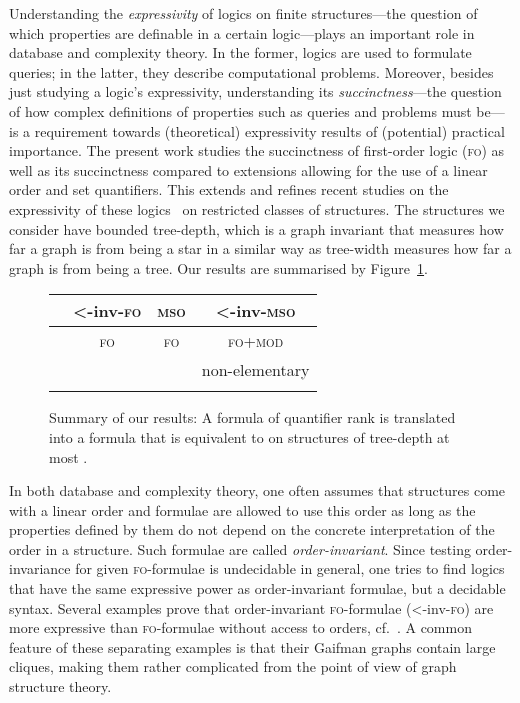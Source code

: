 \documentclass[11pt]{article}
\newcommand{\logic}[1]{\textsc{#1}}
\newcommand{\FO}{\logic{fo}}
\newcommand{\FOmod}{\logic{fo+mod}}
\newcommand{\MSO}{\logic{mso}}
\newcommand{\ordinv}[1]{\textnormal{{\small \textless}-inv-}#1}
\newcommand{\oiFO}{\ordinv{\FO{}}}
\newcommand{\oiMSO}{\ordinv{\MSO{}}}
\begin{document}
Understanding the \emph{expressivity} of logics on finite structures---the
question of which properties are definable in a certain logic---plays an
important role in database and complexity theory. In the former, logics are used
to formulate queries; in the latter, they describe computational
problems. Moreover, besides just studying a logic's expressivity, understanding
its \emph{succinctness}---the question of how complex definitions of properties
such as queries and problems must be---is a requirement towards (theoretical)
expressivity results of (potential) practical importance. The present work
studies the succinctness of first-order logic (\FO{}) as well as its
succinctness compared to extensions allowing for the use of a linear order and
set quantifiers. This extends and refines recent studies on the expressivity of
these logics~\cite{BenediktSegoufin2009,ElberfeldGT12} on restricted classes of
structures. The structures we consider have bounded tree-depth, which is a graph
invariant that measures how far a graph is from being a star in a similar way as
tree-width measures how far a graph is from being a tree. Our results are
summarised by Figure~\ref{fig:results}.

\begin{figure}[t]
  \begin{center}
    \begin{tabular}{c @{~~~~~~~} c @{~~~~~~~} c @{~~~~~~~} c}
      \toprule
      
      & \oiFO{} & \MSO{} & \oiMSO
      \\
      \midrule
       & \FO{} & \FO{} & \FOmod
      \\
       &  &
       & non-elementary
      \\
       &  &  & \\
      \bottomrule
    \end{tabular}
    \end{center}
  \caption{Summary of our results: A formula  of quantifier
    rank  is translated into a formula  that is equivalent
    to  on structures of tree-depth at most .}
  \label{fig:results}
\end{figure}

In both database and complexity theory, one often assumes that structures come
with a linear order and formulae are allowed to use this order as long as the
properties defined by them do not depend on the concrete interpretation of the
order in a structure. Such formulae are called \emph{order-invariant}. Since
testing order-invariance for given \FO{}-formulae is undecidable in general, one
tries to find logics that have the same expressive power as order-invariant
formulae, but a decidable syntax. Several examples prove that order-invariant
\FO{}-formulae (\oiFO{}) are more expressive than \FO{}-formulae without access
to orders, cf.~\cite{Schweikardt2013}.  A common feature of these separating
examples is that their Gaifman graphs contain large cliques, making them rather
complicated from the point of view of graph structure theory. 
\end{document}
